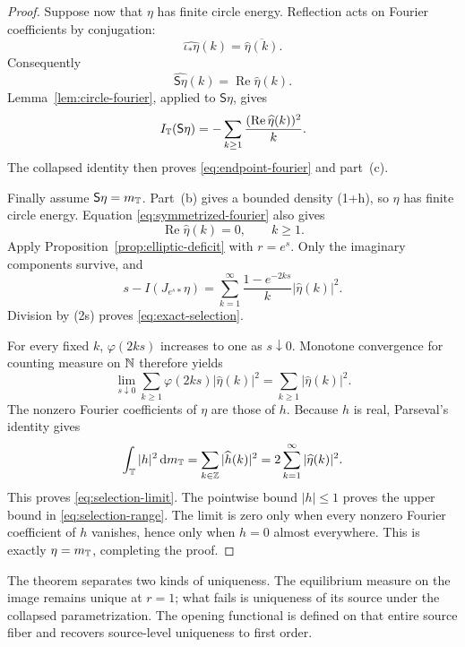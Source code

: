 \begin{proof}
Suppose now that \(\eta\) has finite circle energy.  Reflection acts on
Fourier coefficients by conjugation:
\[
 \widehat{\iota_\ast\eta}(k)
 =\overline{\widehat\eta(k)}.
\]
Consequently
\begin{equation}\label{eq:symmetrized-fourier}
 \widehat{\mathsf S\eta}(k)
 =\operatorname{Re}\widehat\eta(k).
\end{equation}
Lemma~\ref{lem:circle-fourier}, applied to
\(\mathsf S\eta\), gives
\[
 I_{\mathbb{T}}(\mathsf S\eta)
 =-\sum_{k\geq1}
 \frac{(\operatorname{Re}\widehat\eta(k))^2}{k}.
\]
The collapsed identity then proves \eqref{eq:endpoint-fourier} and
part~\textup{(c)}.

Finally assume \(\mathsf S\eta=m_{\mathbb{T}}\).  Part~\textup{(b)} gives a
bounded density (1+h), so \(\eta\) has finite circle energy.  Equation
\eqref{eq:symmetrized-fourier} also gives
\begin{equation}\label{eq:purely-imaginary-modes}
 \operatorname{Re}\widehat\eta(k)=0,
 \qquad k\geq1.
\end{equation}
Apply Proposition~\ref{prop:elliptic-deficit} with \(r=e^s\).  Only the
imaginary components survive, and
\begin{equation}\label{eq:selection-before-division}
 s-I(J_{e^s\ast}\eta)
 =\sum_{k=1}^{\infty}
 \frac{1-e^{-2ks}}{k}|\widehat\eta(k)|^2.
\end{equation}
Division by (2s) proves \eqref{eq:exact-selection}.

For every fixed \(k\), \(\varphi(2ks)\) increases to one as
\(s\downarrow0\).  Monotone convergence for counting measure on
\(\mathbb{N}\) therefore yields
\[
 \lim_{s\downarrow0}
 \sum_{k\geq1}\varphi(2ks)|\widehat\eta(k)|^2
 =\sum_{k\geq1}|\widehat\eta(k)|^2.
\]
The nonzero Fourier coefficients of \(\eta\) are those of \(h\).
Because \(h\) is real, Parseval's identity gives
\[
 \int_{\mathbb{T}}|h|^2\,\mathrm{d} m_{\mathbb{T}}
 =\sum_{k\in\mathbb{Z}}|\widehat h(k)|^2
 =2\sum_{k=1}^{\infty}|\widehat\eta(k)|^2.
\]
This proves \eqref{eq:selection-limit}.  The pointwise bound
\(|h|\leq1\) proves the upper bound in
\eqref{eq:selection-range}.  The limit is zero only when every nonzero
Fourier coefficient of \(h\) vanishes, hence only when \(h=0\) almost
everywhere.  This is exactly \(\eta=m_{\mathbb{T}}\), completing the proof.
\end{proof}

The theorem separates two kinds of uniqueness.  The equilibrium measure
on the image remains unique at \(r=1\); what fails is uniqueness of its
source under the collapsed parametrization.  The opening functional is
defined on that entire source fiber and recovers source-level uniqueness
to first order.
